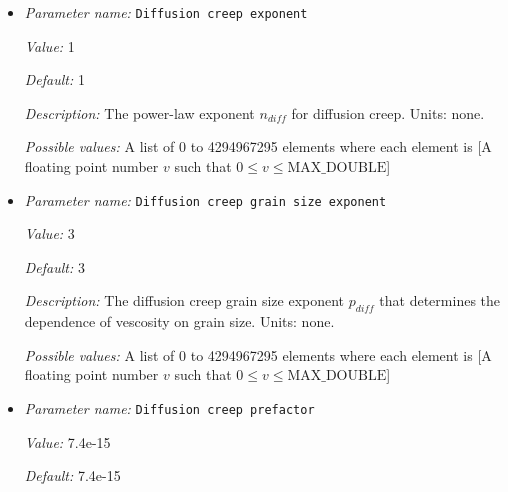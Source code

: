 \begin{itemize}
{\it Value:} 4e-6


{\it Default:} 4e-6


{\it Description:} The activation volume for diffusion creep $V_{diff}$. Units: $m^3/mol$.


{\it Possible values:} A list of 0 to 4294967295 elements where each element is [A floating point number $v$ such that $0 \leq v \leq \text{MAX\_DOUBLE}$]
\item {\it Parameter name:} {\tt Diffusion creep exponent}
\label{parameters:Material model/Grain size model/Diffusion creep exponent}


{\it Value:} 1


{\it Default:} 1


{\it Description:} The power-law exponent $n_{diff}$ for diffusion creep. Units: none.


{\it Possible values:} A list of 0 to 4294967295 elements where each element is [A floating point number $v$ such that $0 \leq v \leq \text{MAX\_DOUBLE}$]
\item {\it Parameter name:} {\tt Diffusion creep grain size exponent}
\label{parameters:Material model/Grain size model/Diffusion creep grain size exponent}


{\it Value:} 3


{\it Default:} 3


{\it Description:} The diffusion creep grain size exponent $p_{diff}$ that determines the dependence of vescosity on grain size. Units: none.


{\it Possible values:} A list of 0 to 4294967295 elements where each element is [A floating point number $v$ such that $0 \leq v \leq \text{MAX\_DOUBLE}$]
\item {\it Parameter name:} {\tt Diffusion creep prefactor}
\label{parameters:Material model/Grain size model/Diffusion creep prefactor}


{\it Value:} 7.4e-15


{\it Default:} 7.4e-15



\end{itemize}
